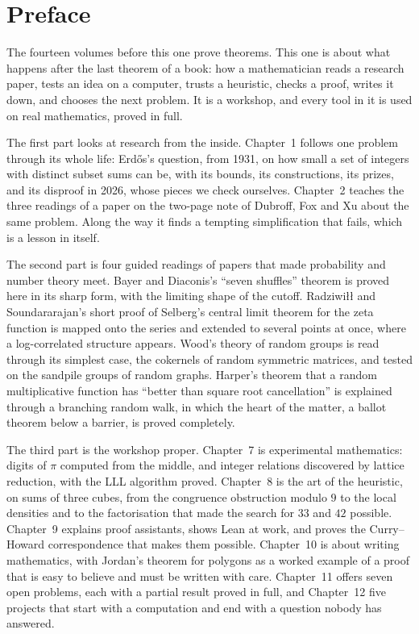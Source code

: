 \chapter*{Preface}
The fourteen volumes before this one prove theorems. This one is about what happens after the last theorem of a book: how a
mathematician reads a research paper, tests an idea on a computer, trusts a heuristic, checks a proof, writes it down, and
chooses the next problem. It is a workshop, and every tool in it is used on real mathematics, proved in full.

The first part looks at research from the inside. Chapter~1 follows one problem through its whole life: Erd\H os's question,
from 1931, on how small a set of integers with distinct subset sums can be, with its bounds, its constructions, its prizes,
and its disproof in 2026, whose pieces we check ourselves. Chapter~2 teaches the three readings of a paper on the two-page
note of Dubroff, Fox and Xu about the same problem. Along the way it finds a tempting simplification that fails, which is a
lesson in itself.

The second part is four guided readings of papers that made probability and number theory meet. Bayer and Diaconis's
``seven shuffles'' theorem is proved here in its sharp form, with the limiting shape of the cutoff. Radziwiłł and
Soundararajan's short proof of Selberg's central limit theorem for the zeta function is mapped onto the series and extended
to several points at once, where a log-correlated structure appears. Wood's theory of random groups is read through its simplest
case, the cokernels of random symmetric matrices, and tested on the sandpile groups of random graphs. Harper's theorem that a random multiplicative function has ``better than square
root cancellation'' is explained through a branching random walk, in which the heart of the matter, a ballot theorem below
a barrier, is proved completely.

The third part is the workshop proper. Chapter~7 is experimental mathematics: digits of $\pi$ computed from the middle,
and integer relations discovered by lattice reduction, with the LLL algorithm proved. Chapter~8 is the art of the heuristic,
on sums of three cubes, from the congruence obstruction modulo $9$ to the local densities and to the factorisation that
made the search for $33$ and $42$ possible. Chapter~9 explains proof assistants, shows Lean at work, and proves the
Curry--Howard correspondence that makes them possible. Chapter~10 is about writing mathematics, with Jordan's theorem for
polygons as a worked example of a proof that is easy to believe and must be written with care. Chapter~11 offers seven open
problems, each with a partial result proved in full, and Chapter~12 five projects that start with a computation and end
with a question nobody has answered.

